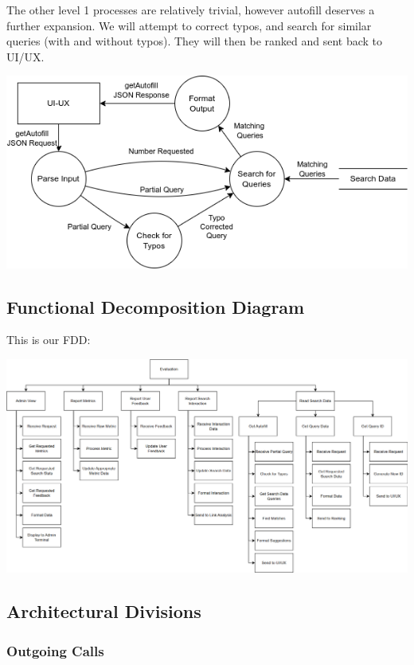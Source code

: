 \medskip

The other level 1 processes are relatively trivial, however autofill deserves a further expansion. We will attempt to correct typos, and search for similar queries (with and without typos). They will then be ranked and sent back to UI/UX.

\begin{center}
  \includegraphics[scale=0.5]{DFDs/LowLevelDFDs-GetAutofill.drawio (2).png}
\end{center}

\subsection*{Functional Decomposition Diagram}

This is our FDD:
\begin{center}
  \includegraphics[width=\textwidth]{FDD/FDD.png}
\end{center}

\subsection*{Architectural Divisions}

\subsubsection*{Outgoing Calls}

